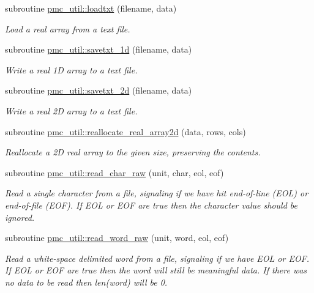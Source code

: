 \begin{DoxyCompactItemize}
subroutine \mbox{\hyperlink{namespacepmc__util_a89e25708a94945ec739408bceef13762}{pmc\+\_\+util\+::loadtxt}} (filename, data)
\begin{DoxyCompactList}\small\item\em Load a real array from a text file. \end{DoxyCompactList}\item 
subroutine \mbox{\hyperlink{namespacepmc__util_a22ca26ff282a9278ae95f877cb999786}{pmc\+\_\+util\+::savetxt\+\_\+1d}} (filename, data)
\begin{DoxyCompactList}\small\item\em Write a real 1D array to a text file. \end{DoxyCompactList}\item 
subroutine \mbox{\hyperlink{namespacepmc__util_a136a49845a94549788f385e2c0f625a6}{pmc\+\_\+util\+::savetxt\+\_\+2d}} (filename, data)
\begin{DoxyCompactList}\small\item\em Write a real 2D array to a text file. \end{DoxyCompactList}\item 
subroutine \mbox{\hyperlink{namespacepmc__util_ae3535489875ec1ba14b921bd43cff11c}{pmc\+\_\+util\+::reallocate\+\_\+real\+\_\+array2d}} (data, rows, cols)
\begin{DoxyCompactList}\small\item\em Reallocate a 2D real array to the given size, preserving the contents. \end{DoxyCompactList}\item 
subroutine \mbox{\hyperlink{namespacepmc__util_ad88e1503acea1e8e33d13275f37b9755}{pmc\+\_\+util\+::read\+\_\+char\+\_\+raw}} (unit, char, eol, eof)
\begin{DoxyCompactList}\small\item\em Read a single character from a file, signaling if we have hit end-\/of-\/line (E\+OL) or end-\/of-\/file (E\+OF). If E\+OL or E\+OF are true then the character value should be ignored. \end{DoxyCompactList}\item 
subroutine \mbox{\hyperlink{namespacepmc__util_aa8ba2bc88e899084afec8b5d7f3a8b92}{pmc\+\_\+util\+::read\+\_\+word\+\_\+raw}} (unit, word, eol, eof)
\begin{DoxyCompactList}\small\item\em Read a white-\/space delimited word from a file, signaling if we have E\+OL or E\+OF. If E\+OL or E\+OF are true then the word will still be meaningful data. If there was no data to be read then len(word) will be 0. \end{DoxyCompactList}\item 

\end{DoxyCompactItemize}
